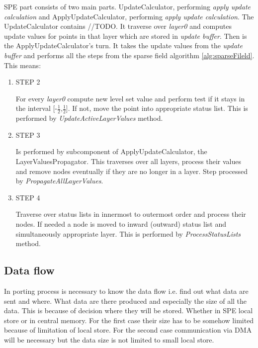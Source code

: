 SPE part consists of two main parts.
UpdateCalculator, performing \emph{apply update calculation} and ApplyUpdateCalculator, performing \emph{apply update calculation}.
The UpdateCalculator contains //TODO. It traverse over \emph{layer0} and computes update values for points in that layer which are stored in \emph{update buffer}.
Then is the ApplyUpdateCalculator's turn.
It takes the update values from the \emph{update buffer} and performs all the steps from the sparse field algorithm \ref{alg:sparseFileld}.
This means:
\begin{enumerate}
\item STEP 2
\par
For every \emph{layer0} compute new level set value and perform test if it stays in the interval [-$\frac{1}{2}$,$\frac{1}{2}$].
If not, move the point into appropriate status list.
This is performed by \emph{UpdateActiveLayerValues} method.

\item STEP 3
\par
Is performed by subcomponent of ApplyUpdateCalculator, the LayerValuesPropagator.
This traverses over all layers, process their values and remove nodes eventually if they are no longer in a layer.
Step processed by \emph{PropagateAllLayerValues}.

\item STEP 4
\par
Traverse over status lists in innermost to outermost order and process their
nodes. If needed a node is moved to inward (outward) status list and
simultaneously appropriate layer. This is performed by \emph{ProcessStatusLists}
method.
\end{enumerate}

\subsection{Data flow}

In porting process is necessary to know the data flow i.e. find out what data are sent and where.
What data are there produced and especially the size of all the data.
This is because of decision where they will be stored.
Whether in SPE local store or in central memory.
For the first case their size has to be somehow limited because of limitation of local store.
For the second case communication via DMA will be necessary but the data size is not limited to small local store.

